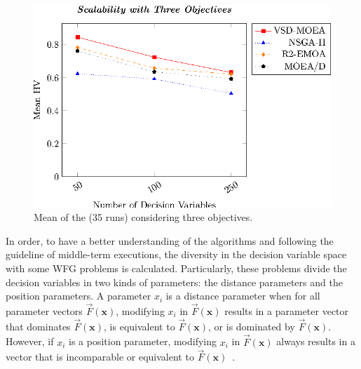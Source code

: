\begin{figure}[t]
\centering
\includegraphics[]{Images/Graphic-Scalability-3obj_tikz-figure0.eps}
%
\caption{Mean of the \HV{} (35 runs) considering three objectives.} \label{fig:variable-decision-scalability-3obj}
\end{figure}

In order, to have a better understanding of the algorithms and following the guideline of middle-term executions, the diversity in the decision variable space with some WFG problems is calculated.
%
Particularly, these problems divide the decision variables in two kinds of parameters: the distance parameters and the position parameters.
%
A parameter $x_i$ is a distance parameter when for all parameter vectors $\vec{F}(\mathbf{x})$, modifying $x_i$ in $\vec{F}(\mathbf{x})$ results in a parameter vector that dominates $\vec{F}(\mathbf{x})$, is equivalent to $\vec{F}(\mathbf{x})$, or is dominated by $\vec{F}(\mathbf{x})$.
%
However, if $x_i$ is a position parameter, modifying $x_i$ in $\vec{F}(\mathbf{x})$ always results in a vector that is incomparable or equivalent to $\vec{F}(\mathbf{x})$~\cite{huband2005scalable}.
%

